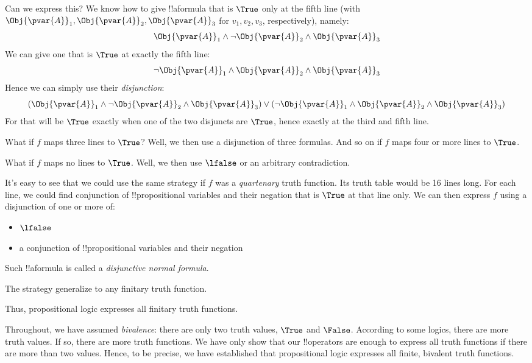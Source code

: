 \documentclass[../../../include/open-logic-section]{subfiles}
\begin{document}
Can we express this? We know how to give !!a{formula} that is $\True$
only at the fifth line (with 
$\Obj{\pvar{A}}_1,\Obj{\pvar{A}}_2,\Obj{\pvar{A}}_3$ for $v_1,v_2,v_3$, 
respectively), namely:
$$\Obj{\pvar{A}}_1\land\lnot\Obj{\pvar{A}}_2\land\Obj{\pvar{A}}_3$$
We can give one that is $\True$ at exactly the fifth line:
$$\lnot\Obj{\pvar{A}}_1\land\Obj{\pvar{A}}_2\land\Obj{\pvar{A}}_3$$
Hence we can simply use their \emph{disjunction}:
$$(\Obj{\pvar{A}}_1\land\lnot\Obj{\pvar{A}}_2\land\Obj{\pvar{A}}_3)
\lor(\lnot\Obj{\pvar{A}}_1\land\Obj{\pvar{A}}_2\land\Obj{\pvar{A}}_3)$$
For that will be $\True$ exactly when one of the two disjuncts are $\True$,
hence exactly at the third and fifth line.

What if $f$ maps three lines to $\True$? Well, we then use a disjunction
of three formulas. And so on if $f$ maps four or more lines to $\True$.

What if $f$ maps no lines to $\True$. Well, we then use $\lfalse$ 
or an arbitrary contradiction. 

It's easy to see that we could use the same strategy if $f$ was a
\emph{quartenary} truth function. Its truth table would be 16 lines long.
For each line, we could find conjunction of !!{propositional variable}s
and their negation that is $\True$ at that line only. We can then 
express $f$ using a disjunction of one or more of:
\begin{itemize}
    \item $\lfalse$
    \item a conjunction of !!{propositional variable}s
    and their negation
\end{itemize}
Such !!a{formula} is called a \emph{disjunctive normal formula}.

The strategy generalize to any finitary truth function. 

Thus, propositional logic expresses all finitary truth functions.

Throughout, we have assumed \emph{bivalence}: there are only two truth
values, $\True$ and $\False$. According to some logics, there are more
truth values. If so, there are more truth functions. We have only 
show that our !!{operator}s are enough to express all truth functions if 
there are more than two values. Hence, to be precise, we have established that
propositional logic expresses all finite, bivalent truth functions.
\end{document}
